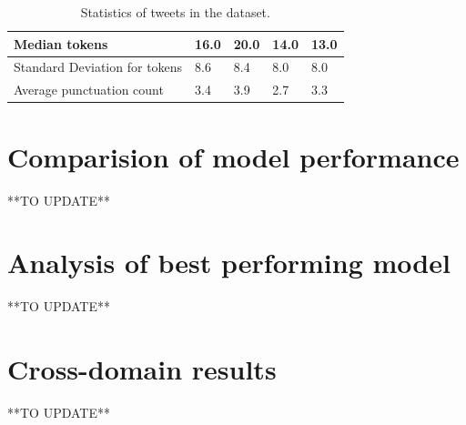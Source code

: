\begin{table}[htbp]
\begin{tabularx}{\textwidth}{|l|X|X|X|X|}
        \hline
        Median tokens                   & 16.0                & 20.0                & 14.0                    & 13.0            \\
        \hline
        Standard Deviation for tokens   & 8.6                 & 8.4                 & 8.0                     & 8.0             \\
        \hline
        \hline
        Average punctuation count       & 3.4                 & 3.9                 & 2.7                     & 3.3             \\
        \hline
    \end{tabularx}
    \caption{Statistics of tweets in the dataset.}
    \label{tab: tweets_statistics}
\end{table}



\section{Comparision of model performance}
**TO UPDATE**

\section{Analysis of best performing model}
**TO UPDATE**

\section{Cross-domain results}
**TO UPDATE**